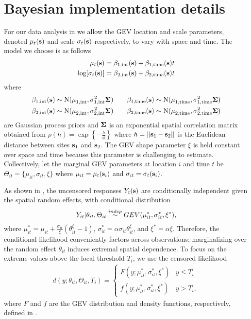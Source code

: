 \documentclass[11pt]{article}
\begin{document}
\section{Bayesian implementation details}\label{ebs:MCMC}
For our data analysis in  we allow the GEV location and scale parameters, denoted $\mu_t(\mbox{\bf s})$ and scale $\sigma_t(\mbox{\bf s})$ respectively, to vary with space and time.
The model we choose is as follows
\begin{align}\label{ebeq:GPprior}
  \mu_t(\mbox{\bf s}) &= \beta_{1, \text{int}}(\mbox{\bf s}) + \beta_{1, \text{time}}(\mbox{\bf s}) t\\
  \log[\sigma_t(\mbox{\bf s})] &= \beta_{2, \text{int}}(\mbox{\bf s}) + \beta_{2, \text{time}}(\mbox{\bf s}) t
\end{align}
where
\begin{align} \label{ebeq:GPhyper}
  \beta_{1, \text{int}}(\mbox{\bf s}) &\sim \text{N}(\mu^{\phantom{2}}_{1, \text{int}}, \sigma^2_{1, \text{int}} \mbox{\boldmath $\Sigma$}) \quad &\beta_{1, \text{time}}(\mbox{\bf s}) &\sim \text{N}(\mu^{\phantom{2}}_{1, \text{time}}, \sigma^2_{1, \text{time}} \mbox{\boldmath $\Sigma$}) \\
  \beta_{2, \text{int}}(\mbox{\bf s}) &\sim \text{N}(\mu^{\phantom{2}}_{2, \text{int}}, \sigma^2_{2, \text{int}} \mbox{\boldmath $\Sigma$}) \quad &\beta_{2, \text{time}}(\mbox{\bf s}) &\sim \text{N}(\mu^{\phantom{2}}_{2, \text{time}}, \sigma^2_{2, \text{time}} \mbox{\boldmath $\Sigma$}) \nonumber
\end{align}
are Gaussian process priors and $\mbox{\boldmath $\Sigma$}$ is an exponential spatial correlation matrix obtained from \mbox{$\rho(h) = \exp\left\{- \frac{h}{\phi}\right\}$} where $h = ||\mbox{\bf s}_1 - \mbox{\bf s}_2||$ is the Euclidean distance between sites $\mbox{\bf s}_1$ and $\mbox{\bf s}_2$.
The GEV shape parameter $\xi$ is held constant over space and time because this parameter is challenging to estimate.
Collectively, let the marginal GEV parameters at location $i$ and time $t$ be $\Theta_{it} = \{\mu_{it},\sigma_{it},\xi\}$ where $\mu_{it} = \mu_t(\mbox{\bf s}_i)$ and $\sigma_{it} = \sigma_t(\mbox{\bf s}_i)$.

As shown in \citet{Reich2012}, the uncensored responses $Y_{t}(\mbox{\bf s})$ are conditionally independent given the spatial random effects, with conditional distribution
\begin{align} \label{ebeq:Ycond}
   Y_{it}|\theta_{it},\Theta_{it}\stackrel{indep}{\sim} GEV(\mu^*_{it}, \sigma_{it}^*,\xi^*),
\end{align}
where $\mu_{it}^* = \mu_{it} + \frac{\sigma_{it}}{\xi}(\theta_{it}^\xi - 1)$,
$\sigma_{it}^* = \alpha\sigma_{it}\theta_{it}^\xi$, and $\xi^* = \alpha\xi$.
Therefore, the conditional likelihood conveniently factors across observations; marginalizing over the random effect $\theta_{it}$ induces extremal spatial dependence.
To focus on the extreme values above the local threshold $T_i$, we use the censored likelihood
\begin{align} \label{ebeq:g}
d(y;\theta_{it},\Theta_{it}, T_i)  =
\left\{\begin{array}{ll}
    F(y;\mu_{it}^*,\sigma_{it}^*,\xi^*) & y \le T_i \\
  f(y;\mu_{it}^*,\sigma_{it}^*,\xi^*) & y>T_i,
\end{array}\right.
\end{align}
where $F$ and $f$ are the GEV distribution and density functions, respectively, defined in .
\end{document}
